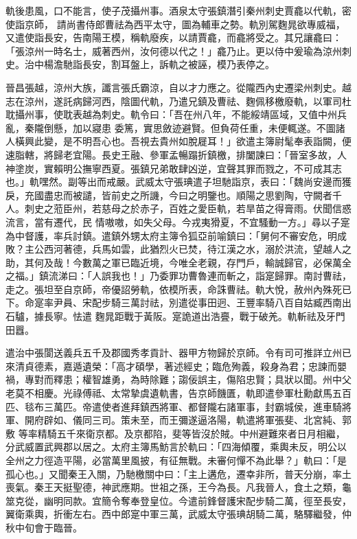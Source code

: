\begin{pinyinscope}
 軌後患風，口不能言，使子茂攝州事。酒泉太守張鎮潛引秦州刺史賈龕以代軌，密使詣京師，
 請尚書侍郎曹祛為西平太守，圖為輔車之勢。軌別駕麴晁欲專威福，又遣使詣長安，告南陽王模，稱軌廢疾，以請賈龕，而龕將受之。其兄讓龕曰：「張涼州一時名士，威著西州，汝何德以代之！」龕乃止。更以侍中爰瑜為涼州刺史。治中楊澹馳詣長安，割耳盤上，訴軌之被誣，模乃表停之。



 晉昌張越，涼州大族，讖言張氏霸涼，自以才力應之。從隴西內史遷梁州刺史。越志在涼州，遂託病歸河西，陰圖代軌，乃遣兄鎮及曹祛、麴佩移檄廢軌，以軍司杜耽攝州事，使耽表越為刺史。軌令曰：「吾在州八年，不能綏靖區域，又值中州兵亂，秦隴倒懸，加以寢患
 委篤，實思斂迹避賢。但負荷任重，未便輒遂。不圖諸人橫興此變，是不明吾心也。吾視去貴州如脫屣耳！」欲遣主簿尉髦奉表詣闕，便速脂轄，將歸老宜陽。長史王融、參軍孟暢蹋折鎮檄，排闔諫曰：「晉室多故，人神塗炭，實賴明公撫寧西夏。張鎮兄弟敢肆凶逆，宜聲其罪而戮之，不可成其志也。」軌嘿然。副等出而戒嚴。武威太守張琠遣子坦馳詣京，表曰：「魏尚安邊而獲戾，充國盡忠而被譴，皆前史之所譏，今曰之明鑒也。順陽之思劉陶，守闕者千人。刺史之蒞臣州，若慈母之於赤子，百姓之愛臣軌，若旱苗之得膏雨。伏聞信惑流言，當有遷代，民
 情嗷嗷，如失父母。今戎夷猾夏，不宜騷動一方。」尋以子寔為中督護，率兵討鎮。遣鎮外甥太府主簿令狐亞前喻鎮曰：「舅何不審安危，明成敗？主公西河著德，兵馬如雲，此猶烈火已焚，待江漢之水，溺於洪流，望越人之助，其何及哉！今數萬之軍已臨近境，今唯全老親，存門戶，輸誠歸官，必保萬全之福。」鎮流涕曰：「人誤我也！」乃委罪功曹魯連而斬之，詣寔歸罪。南討曹祛，走之。張坦至自京師，帝優詔勞軌，依模所表，命誅曹祛。軌大悅，赦州內殊死已下。命寔率尹員、宋配步騎三萬討祛，別遣從事田迥、王豐率騎八百自姑臧西南出石驢，據長寧。怯遣
 麴晁距戰于黃阪。寔詭道出浩亹，戰于破羌。軌斬祛及牙門田囂。



 遣治中張閬送義兵五千及郡國秀孝貢計、器甲方物歸於京師。令有司可推詳立州已來清貞德素，嘉遁遺榮：「高才碩學，著述經史；臨危殉義，殺身為君；忠諫而嬰禍，專對而釋患；權智雄勇，為時除難；謅佞誤主，傷陷忠賢；具狀以聞。州中父老莫不相慶。光祿傅祗、太常摯虞遺軌書，告京師饑匱，軌即遣參軍杜勳獻馬五百匹、毯布三萬匹。帝遣使者進拜鎮西將軍、都督隴右諸軍事，封霸城侯，進車騎將軍、開府辟如、儀同三司。策未至，而王彌遂逼洛陽，軌遣將軍張斐、北宮純、郭敷
 等率精騎五千來衛京都。及京都陷，斐等皆沒於賊。中州避難來者日月相繼，分武威置武興郡以居之。太府主簿馬魴言於軌曰：「四海傾覆，乘輿未反，明公以全州之力徑造平陽，必當萬里風披，有征無戰。未審何憚不為此舉？」軌曰：「是孤心也。」又聞秦王入關，乃馳檄關中曰：「主上遘危，遷幸非所，普天分崩，率土喪氣。秦王天挺聖德，神武應期。世祖之孫，王今為長。凡我晉人，食土之類，龜筮克從，幽明同款。宜簡令奪奉登皇位。今遣前鋒督護宋配步騎二萬，徑至長安，翼衛乘輿，折衝左右。西中郎寔中軍三萬，武威太守張琠胡騎二萬，駱驛繼發，仲
 秋中旬會于臨晉。




\end{pinyinscope}
